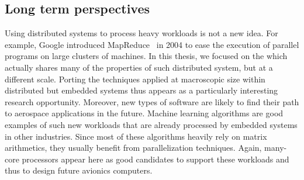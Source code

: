 \documentclass[main.tex]{subfiles}
\begin{document}
\subsection{Long term perspectives} Using distributed systems to process heavy
workloads is not a new idea.  For example, Google introduced
MapReduce~\cite{Dean2004} in 2004 to ease the execution of parallel programs on
large clusters of machines. In this thesis, we focused on the \mppalong which
actually shares many of the properties of such distributed system, but at a
different scale. Porting the techniques applied at macroscopic size within
distributed but embedded systems thus appears as a particularly interesting
research opportunity. Moreover, new types of software are likely to find their
path to aerospace applications in the future. Machine learning algorithms are
good examples of such new workloads that are already processed by embedded
systems in other industries. Since most of these algorithms heavily rely on
matrix arithmetics, they usually benefit from parallelization techniques.
Again, many-core processors appear here as good candidates to support these
workloads and thus to design future avionics computers. 


\subbiblio
\end{document}

